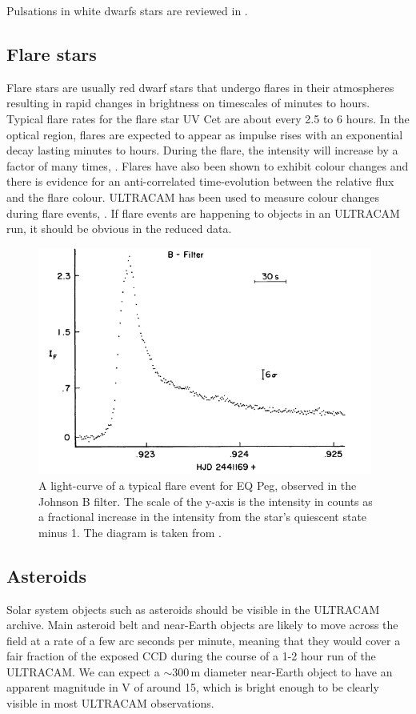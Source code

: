 Pulsations in white dwarfs stars are reviewed in \citet{wingetreview}.

\subsection{Flare stars}
Flare stars are usually red dwarf stars that undergo flares in their atmospheres resulting in rapid changes in brightness on timescales of minutes to hours. Typical flare rates for the flare star {UV Cet} are about every 2.5 to 6 hours. In the optical region, flares are expected to appear as impulse rises with an exponential decay lasting minutes to hours. During the flare, the intensity will increase by a factor of many times, \citep{typicalflares}. Flares have also been shown to exhibit colour changes and there is evidence for an anti-correlated time-evolution between the relative flux and the flare colour. ULTRACAM has been used to measure colour changes during flare events, \citep{ULTRACAMFlare}. If flare events are happening to objects in an ULTRACAM run, it should be obvious in the reduced data.  


\begin{figure}
\centering
\includegraphics[width=110mm]{images/EQ_Peg_typical_flare.png}
\caption{A light-curve of a typical flare event for EQ Peg, observed in the Johnson B filter. The scale of the y-axis is the intensity in counts as a fractional increase in the intensity from the star's quiescent state minus 1. The diagram is taken from \citet{typicalflares}. }
\label{fig:wumadiagram}
\end{figure}

\subsection{Asteroids}
Solar system objects such as asteroids should be visible in the ULTRACAM archive. Main asteroid belt and near-Earth objects are likely to move across the field at a rate of a few arc seconds per minute, meaning that they would cover a fair fraction of the exposed CCD during the course of a 1-2 hour run of the ULTRACAM. We can expect a $\sim 300\,\mbox{m}$ diameter near-Earth object to have an apparent magnitude in V of around 15, \citep{neosmalltelescope} which is bright enough to be clearly visible in most ULTRACAM observations. 

